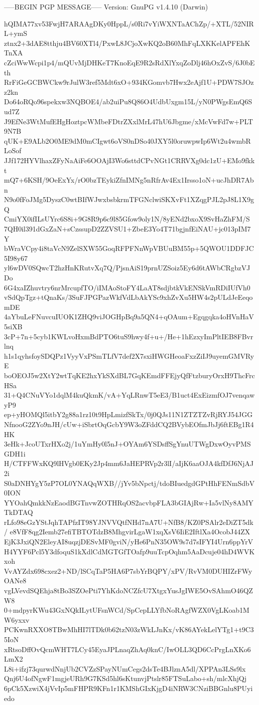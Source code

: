 -----BEGIN PGP MESSAGE-----
Version: GnuPG v1.4.10 (Darwin)

hQIMA77xv53FwjH7ARAAgDKy0HppL/s0Ri7vYiWXNTaAChZp/+XTL/52NIRL+ymS
ztnx2+3dAE8tthju4BV60XTl4/PxwL8JCjoXwKQ2oB60MhFqLXKKelAPFEhKTnXA
cZciWwWcpi1p4/mQUvMjDHKeT7KnoEqE9R2sRdXlYxqZoDlj46hOxZvS/6J0bEth
RrFiGeGCBWCkw9rJulW3ref5Mdt6xO+934KGomvb7Hwx2eAjf1U+PDW7SJOzz2kn
Do64oRQo96spekxw3NQBOE4/ab2uiPu8Q86O4UdbUxgm15L/yN0PWgsEmQ6Sud7Z
J9EfNe3WtMufEHgHoztpcWMbeFDtrZXxlMrL47hU6Jbgme/xMcVwFd7w+PLT9N7B
qUK+E9ALb2O0ME9dM0mCIgwt6oVS0nDSo40JXY5l0oruwpwIp6Wt2u4wmbRLoSof
JJf172HYVlhaxZFyNaAiFe6OOAjI3Wo6sttdCPvNGt1CRRVXg0dc1zU+EMo9fkkt
mQ7+6KSH/9OeExYx/rO0bzTEykiZfnIMNg5nRfrAv4Ex1Irsso1oN+ucJhDR7Abn
N9o0fFoJMg5DyszC0wtBIfWJwxbsbkrmTFGNclwiSKXvFt1XZqgPJL2pJ8L1X9gQ
CmiYX0ifILsUYrc6S8i+9G8R9p6c9l85Gfow9oly1N/8yENd2bxoX9SvHaZhFM/S
7QH0il391dGxZaN+sCzssupD2ZZVSU1+ZbeE3Yo4T71bgjnfEiNAU+jc013pIM7Y
bWraVCpy4i8taVcN9ZelSXW55GoqRFPFNnWpVBUuBM55p+5QWOU1DDFJC5I98y67
yl6wDV0SQwcT2hzHnKRutvXq7Q/PjsnAiS19prnUZSoiz5Ey6d6tAWbCRgbzVJDo
6G4xaIZhuvtry6nrMrcupfTO/iIMAoStoFY4LaAT8sdjbtkVkENSkVmRDiIUfVh0
vSdQpTgz+tQnaKs/3SuFJPGPazWkfVdLbAkYSc9xhZvXu5HW4s2pULdJeEeqomDE
4aYbuLeFNuvcuIUOK1ZHQ9viJOGHpBq9a5QN4+qOAum+Egqgqka4oHVnHaV5siXB
3cP+7n+5cyb1KWLvoHxmBdPTO6tuS9hwy4f+u+/He+1hEzxyImPltIEB8FBvrlnq
h1s1qyhsfoySDQPz1VyyVxPSmTLfV7def2X7sxiHWGHeoaFxzZiIJ9uyemGMVRyE
boOEOJ5w2XtY2wtTqKE2hxYkSXdBL7GqKEmdFFEjyQfFtzburyOrxH9ThcFrcHSa
31+Q4CNuVYo1dqlM4kuQkmK/vA+YqLRnwT5eE3/B1uct4ExEizmfOJ7venqawyP9
ep+yHOMQl5itbY2g88a1rz10t9HpLmizfSkTx/0j0QJs11N1ZTZTZvRjRYJ54JGG
NfnooG2ZYo9nJH/cUw+iSbrtOqGcbY9W3oZFddCQ2BVybEOfmJbJj6ftEBg1R4HK
3eHk+JcoUTxrHXo2j/1uYmHy0l5nJ+OYAm6YSDsffSgYnuUTWgDxwOyvPMSGDH1i
H/CTFFWxKQ9lHVgb0EKy2Jp4mm6JaHEPRVp2r3lI/aIjK6aaOJA4kfDfJ6NjAJ2i
S0aDNHYgY5zP7OL0YNAQqWXB//jYv5bNpctj/tdoBIuedgdGPtHhFENmSdbV0ION
YYOahQmkkNzEaodBGTnvwZOTHRqOS2acvbpFLA3bGIAjRw+Ia5vlNy8AMYTkDTAQ
rLfo98eGzYStJqhTAPfzIT98YJNVVQtfNHd7nA7U+NfB8/KZ0PSAlr2eDiZT5dk/
e8VfF8qg2Iemb27efiTBTOTdzB8MhgvirLgaW1xqXsV6IiE2IftlXa4OcobJ44ZX
EjK3JxiQN2EleyAI8uqzjDESvMF0gviN/yHe6PnN35OW9s7d7sIFYI4Urn6ppYrV
H4YYF6Pcl5Y3dfoquS1kXdlCdMGTGfTOafp9uuTcpOqhm5AaDcuje04hD4WVKxoh
VvAYZdx698cxez2+ND/lSCqTaP5HA6P7sbYrBQPY/xPV/RvVM0DUHIZrFWyOANe8
vgLVevdSQEhja8tBo3SZOePti7YhKdoNCZfcU7XtgxYusJgIWE5OvSAhmO46QZW8
0+mdpyrKWu43GxNQkILytUFsnWCd/SpCepLLYfbNoRAgfWZX0VgLKoab1MW6yxxv
PCKwnRXXO8TBwMhHI7lTDk0b62tzN03zWkLJnKx/vK86AYekLelYTg1+t9C35IoN
xRtsoDffOvQcmWHT7LCy45EyaJPLnaqZhAq0knC/IwOLL3QD6CcPrgLnXKo6LmX2
L8i+ifzj73qurwdNnjUb2CVZzSPayNUmCegs2dsTe4BJlznA5dl/XPPAn3LSs9lx
Qnj6U4ofNgwF1mgjeURh9G7KSd5hl6sKtunvjPtslr85FTSuLabo+sh/mlcXhjQj
6pCk5XzwiX4jVvIp5mFHPR9KFn1r1KMShGIxKjgD4iNRW3CNziBBGnlu8PUyiedo
